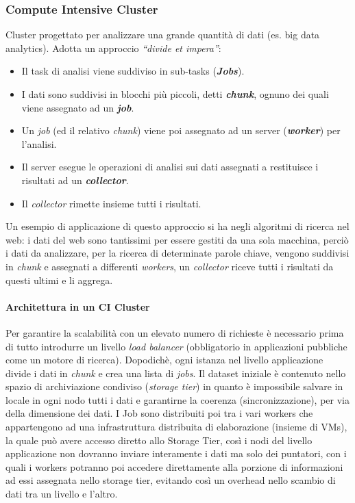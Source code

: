 \documentclass{article}
\begin{document}
\subsubsection{Compute Intensive Cluster}
Cluster progettato per analizzare una grande quantità di dati (es. big data analytics). 
Adotta un approccio \textit{“divide et impera”}:
\begin{itemize}
    \item Il task di analisi viene suddiviso in sub-tasks (\textit{\textbf{Jobs}}).
    \item I dati sono suddivisi in blocchi più piccoli, detti \textit{\textbf{chunk}}, ognuno dei quali viene assegnato ad un \textit{\textbf{job}}.
    \item Un \textit{job} (ed il relativo \textit{chunk}) viene poi assegnato ad un server (\textit{\textbf{worker}}) per l’analisi.
    \item Il server esegue le operazioni di analisi sui dati assegnati a restituisce i risultati ad un \textit{\textbf{collector}}.
    \item Il \textit{collector} rimette insieme tutti i risultati.
\end{itemize}
Un esempio di applicazione di questo approccio si ha negli algoritmi di ricerca nel web: i dati del web sono tantissimi per essere gestiti da una sola macchina, perciò i dati da analizzare, per la ricerca di determinate parole chiave, vengono suddivisi in \textit{chunk} e assegnati a differenti \textit{workers}, un \textit{collector} riceve tutti i risultati da questi ultimi e li aggrega.
\paragraph{Architettura in un CI Cluster}
Per garantire la scalabilità con un elevato numero di richieste è necessario prima di tutto introdurre un livello \textit{load balancer} (obbligatorio in applicazioni pubbliche come un motore di ricerca). Dopodichè, ogni istanza nel livello applicazione divide i dati in \textit{chunk} e crea una lista di \textit{jobs}. Il dataset iniziale è contenuto nello spazio di archiviazione condiviso (\textit{storage tier}) in quanto è impossibile salvare in locale in ogni nodo tutti i dati e garantirne la coerenza (sincronizzazione), per via della dimensione dei dati. I Job sono distribuiti poi tra i vari workers che appartengono ad una infrastruttura distribuita di elaborazione (insieme di VMs), la quale può avere accesso diretto allo Storage Tier, così i nodi del livello applicazione non dovranno inviare interamente i dati ma solo dei puntatori, con i quali i workers potranno poi accedere direttamente alla porzione di informazioni ad essi assegnata nello storage tier, evitando così un overhead nello scambio di dati tra un livello e l'altro.
\end{document}
